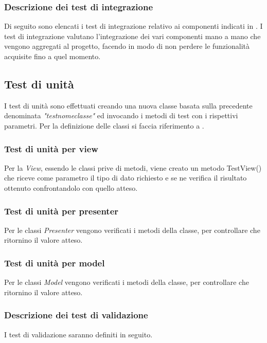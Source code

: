 \subsubsection{Descrizione dei test di integrazione}
Di seguito sono elencati i test di integrazione relativo ai componenti indicati in \infoST. I test di integrazione valutano l'integrazione dei vari componenti mano a mano che vengono aggregati al progetto, facendo in modo di non perdere le funzionalità acquisite fino a quel momento.

\subsection{Test di unità}
I test di unità sono effettuati creando una nuova classe basata sulla precedente denominata \textit{"testnomeclasse"} ed invocando i metodi di test con i rispettivi parametri. Per la definizione delle classi si faccia riferimento a \infoDP.
\subsubsection{Test di unità per view}

Per la \textit{View}, essendo le classi prive di metodi, viene creato un metodo TestView() che riceve come parametro il tipo di dato richiesto e se ne verifica il risultato ottenuto confrontandolo con quello atteso.

\subsubsection{Test di unità per presenter}
Per le classi \textit{Presenter} vengono verificati i metodi della classe, per controllare che ritornino il valore atteso.

\subsubsection{Test di unità per model}
Per le classi \textit{Model} vengono verificati i metodi della classe, per controllare che ritornino il valore atteso.

\subsubsection{Descrizione dei test di validazione}
I test di validazione saranno definiti in seguito.



